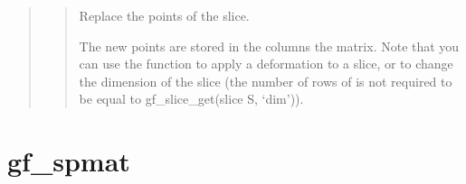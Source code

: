 \documentclass[a4paper,11pt,english]{sphinxmanual}
\begin{document}
\sphinxAtStartPar
{}
\begin{quote}

\sphinxAtStartPar
{}
\begin{quote}

\sphinxAtStartPar
Replace the points of the slice.

\sphinxAtStartPar
The new points  are stored in the columns the matrix. Note that
you can use the function to apply a deformation to a slice, or to
change the dimension of the slice (the number of rows of  is not
required to be equal to gf\_slice\_get(slice S, ‘dim’)).
\end{quote}
\end{quote}


\section{gf\_spmat}
\label{\detokenize{matlab_octave/cmdref_gf_spmat:gf-spmat}}\label{\detokenize{matlab_octave/cmdref_gf_spmat::doc}}
\sphinxAtStartPar
{}
\end{document}

